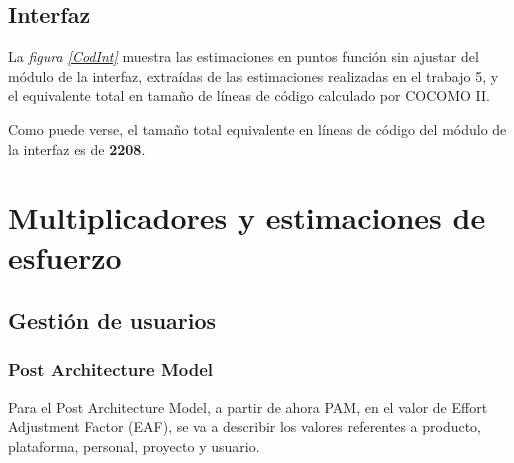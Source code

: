 \documentclass[11pt,a4paper,spanish,twoside]{book}
\begin{document}
\section{Interfaz}
La \emph{figura \ref{CodInt}} muestra las estimaciones en puntos función sin
ajustar del módulo de la interfaz, extraídas de las estimaciones realizadas en
el trabajo 5, y el equivalente total en tamaño de líneas de código calculado
por COCOMO II.


Como puede verse, el tamaño total equivalente en líneas de código del módulo
de la interfaz es de \textbf{2208}.

\chapter{Multiplicadores y estimaciones de esfuerzo}
\section{Gestión de usuarios}
\subsection{Post Architecture Model}
Para el Post Architecture Model, a partir de ahora PAM, en el valor de Effort
Adjustment Factor (EAF), se va a describir los valores referentes a producto,
plataforma, personal, proyecto y usuario. 
\end{document}
